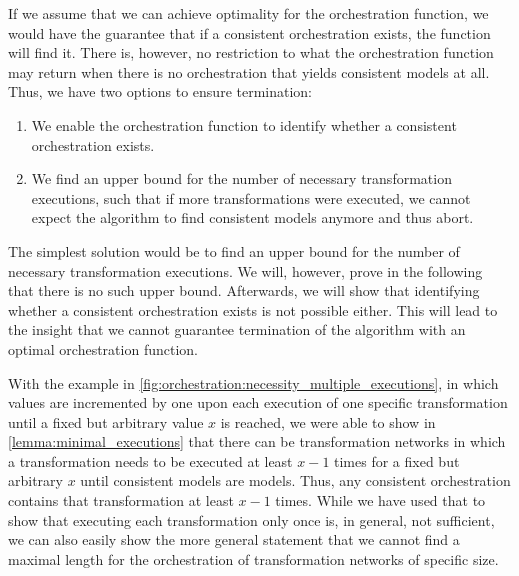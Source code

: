If we assume that we can achieve optimality for the orchestration function, we would have the guarantee that if a consistent orchestration exists, the function will find it.
There is, however, no restriction to what the orchestration function may return when there is no orchestration that yields consistent models at all.
Thus, we have two options to ensure termination:
\begin{enumerate}
    \item We enable the orchestration function to identify whether a consistent orchestration exists.
    \item We find an upper bound for the number of necessary transformation executions, such that if more transformations were executed, we cannot expect the algorithm to find consistent models anymore and thus abort. 
\end{enumerate}

The simplest solution would be to find an upper bound for the number of necessary transformation executions.
We will, however, prove in the following that there is no such upper bound.
Afterwards, we will show that identifying whether a consistent orchestration exists is not possible either.
This will lead to the insight that we cannot guarantee termination of the algorithm with an optimal orchestration function.



With the example in \autoref{fig:orchestration:necessity_multiple_executions}, in which values are incremented by one upon each execution of one specific transformation until a fixed but arbitrary value $x$ is reached, we were able to show in \autoref{lemma:minimal_executions} that there can be transformation networks in which a transformation needs to be executed at least $x-1$ times for a fixed but arbitrary $x$ until consistent models are models.
Thus, any consistent orchestration contains that transformation at least $x-1$ times.
While we have used that to show that executing each transformation only once is, in general, not sufficient, we can also easily show the more general statement that we cannot find a maximal length for the orchestration of transformation networks of specific size.

